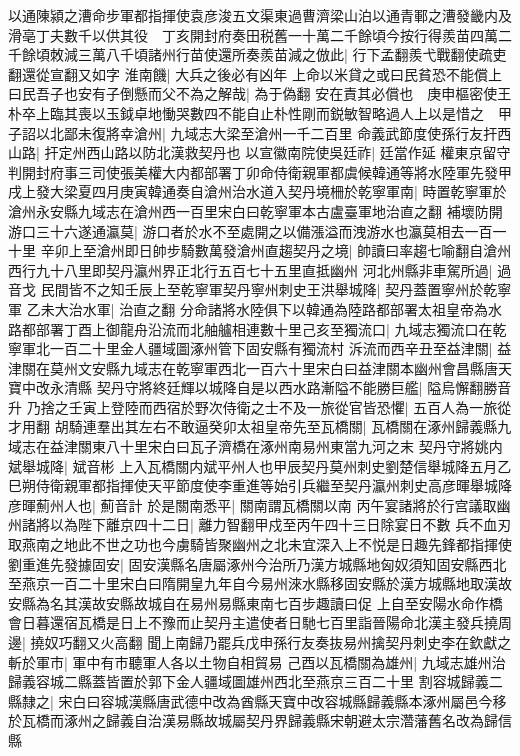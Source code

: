 以通陳潁之漕命步軍都指揮使袁彦浚五文渠東過曹濟梁山泊以通青鄆之漕發畿内及滑亳丁夫數千以供其役　丁亥開封府奏田税舊一十萬二千餘頃今按行得羨苗四萬二千餘頃敇減三萬八千頃諸州行苗使還所奏羨苗減之倣此|{
	行下孟翻羨弋戰翻使疏吏翻還從宣翻又如字}
淮南饑|{
	大兵之後必有凶年}
上命以米貸之或曰民貧恐不能償上曰民吾子也安有子倒懸而父不為之解哉|{
	為于偽翻}
安在責其必償也　庚申樞密使王朴卒上臨其喪以玉鉞卓地慟哭數四不能自止朴性剛而鋭敏智略過人上以是惜之　甲子詔以北鄙未復將幸滄州|{
	九域志大梁至滄州一千二百里}
命義武節度使孫行友扞西山路|{
	扞定州西山路以防北漢救契丹也}
以宣徽南院使吳廷祚|{
	廷當作延}
權東京留守判開封府事三司使張美權大内都部署丁卯命侍衛親軍都虞候韓通等將水陸軍先發甲戌上發大梁夏四月庚寅韓通奏自滄州治水道入契丹境柵於乾寧軍南|{
	時置乾寧軍於滄州永安縣九域志在滄州西一百里宋白曰乾寧軍本古盧臺軍地治直之翻}
補壞防開游口三十六遂通瀛莫|{
	游口者於水不至處開之以備漲溢而洩游水也瀛莫相去一百一十里}
辛卯上至滄州即日帥步騎數萬發滄州直趨契丹之境|{
	帥讀曰率趨七喻翻自滄州西行九十八里即契丹瀛州界正北行五百七十五里直抵幽州}
河北州縣非車駕所過|{
	過音戈}
民間皆不之知壬辰上至乾寧軍契丹寧州刺史王洪舉城降|{
	契丹蓋置寧州於乾寧軍}
乙未大治水軍|{
	治直之翻}
分命諸將水陸俱下以韓通為陸路都部署太祖皇帝為水路都部署丁酉上御龍舟沿流而北舳艫相連數十里己亥至獨流口|{
	九域志獨流口在乾寧軍北一百二十里金人疆域圖涿州管下固安縣有獨流村}
泝流而西辛丑至益津關|{
	益津關在莫州文安縣九域志在乾寧軍西北一百六十里宋白曰益津關本幽州會昌縣唐天寶中改永清縣}
契丹守將終廷輝以城降自是以西水路漸隘不能勝巨艦|{
	隘烏懈翻勝音升}
乃捨之壬寅上登陸而西宿於野次侍衛之士不及一旅從官皆恐懼|{
	五百人為一旅從才用翻}
胡騎連羣出其左右不敢逼癸卯太祖皇帝先至瓦橋關|{
	瓦橋關在涿州歸義縣九域志在益津關東八十里宋白曰瓦子濟橋在涿州南易州東當九河之末}
契丹守將姚内斌舉城降|{
	斌音彬}
上入瓦橋關内斌平州人也甲辰契丹莫州刺史劉楚信舉城降五月乙巳朔侍衛親軍都指揮使天平節度使李重進等始引兵繼至契丹瀛州刺史高彦暉舉城降彦暉薊州人也|{
	薊音計}
於是關南悉平|{
	關南謂瓦橋關以南}
丙午宴諸將於行宫議取幽州諸將以為陛下離京四十二日|{
	離力智翻甲戍至丙午四十三日除宴日不數}
兵不血刃取燕南之地此不世之功也今虜騎皆聚幽州之北未宜深入上不悦是日趣先鋒都指揮使劉重進先發據固安|{
	固安漢縣名唐屬涿州今治所乃漢方城縣地匈奴須知固安縣西北至燕京一百二十里宋白曰隋開皇九年自今易州淶水縣移固安縣於漢方城縣地取漢故安縣為名其漢故安縣故城自在易州易縣東南七百步趣讀曰促}
上自至安陽水命作橋會日暮還宿瓦橋是日上不豫而止契丹主遣使者日馳七百里詣晉陽命北漢主發兵撓周邊|{
	撓奴巧翻又火高翻}
聞上南歸乃罷兵戊申孫行友奏抜易州擒契丹刺史李在欽獻之斬於軍市|{
	軍中有市聽軍人各以土物自相貿易}
己酉以瓦橋關為雄州|{
	九域志雄州治歸義容城二縣蓋皆置於郭下金人疆域圖雄州西北至燕京三百二十里}
割容城歸義二縣隸之|{
	宋白曰容城漢縣唐武德中改為酋縣天寶中改容城縣歸義縣本涿州屬邑今移於瓦橋而涿州之歸義自治漢易縣故城屬契丹界歸義縣宋朝避太宗濳藩舊名改為歸信縣}
